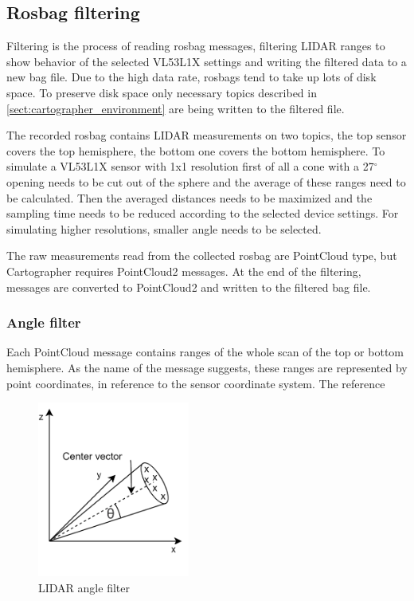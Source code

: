 \subsection{Rosbag filtering}
Filtering is the process of reading rosbag messages, filtering LIDAR ranges to show behavior of the 
selected VL53L1X settings and writing the filtered data to a new bag file. Due to the high data rate, 
rosbags tend to take up lots of disk space. To preserve disk space only necessary topics described in
\ref{sect:cartographer_environment} are being written to the filtered file.

The recorded rosbag contains LIDAR measurements on two topics, the top sensor covers the top hemisphere,
the bottom one covers the bottom hemisphere. To simulate a VL53L1X sensor  with 1x1 resolution 
first of all a cone with a 27$^{\circ}$ opening needs to be cut out of the sphere and the average of 
these ranges need to be calculated. Then the averaged distances needs to be maximized and the sampling 
time needs to be reduced according to the selected device settings. For simulating higher resolutions,
smaller angle needs to be selected.

The raw measurements read from the collected rosbag are PointCloud type, but Cartographer requires 
PointCloud2 messages. At the end of the filtering, messages are converted to PointCloud2 and written
to the filtered bag file.

\subsubsection{Angle filter}
Each PointCloud message contains ranges of the whole scan of the top or bottom hemisphere. As the name
of the message suggests, these ranges are represented by point coordinates, in reference to the sensor 
coordinate system. The reference 


\begin{figure}[!ht]
    \centering
    \includegraphics[width=50mm, keepaspectratio]{figures/data_angle_filter.png}
    \caption{LIDAR angle filter}
    \label{fig:data_angle_filter}
\end{figure}


